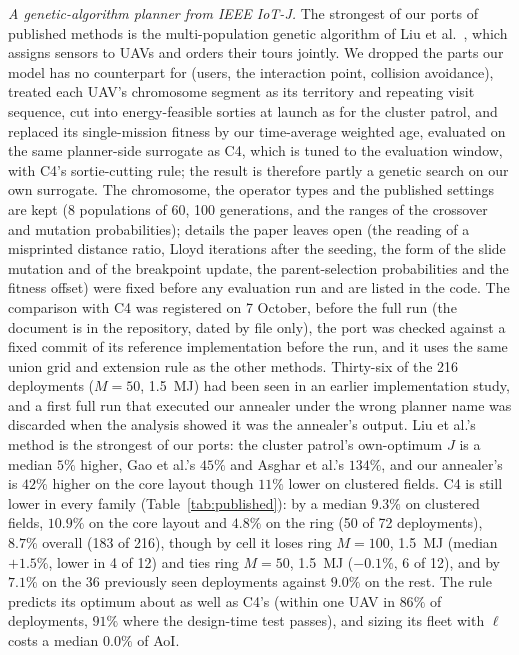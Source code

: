 \documentclass[journal,outdir=./]{IEEEtran}
\begin{document}
\textit{A genetic-algorithm planner from IEEE IoT-J.} The strongest of our ports of published methods is the multi-population genetic algorithm of Liu et al.\ \cite{liu2022aoi}, which assigns sensors to UAVs and orders their tours jointly. We dropped the parts our model has no counterpart for (users, the interaction point, collision avoidance), treated each UAV's chromosome segment as its territory and repeating visit sequence, cut into energy-feasible sorties at launch as for the cluster patrol, and replaced its single-mission fitness by our time-average weighted age, evaluated on the same planner-side surrogate as C4, which is tuned to the evaluation window, with C4's sortie-cutting rule; the result is therefore partly a genetic search on our own surrogate. The chromosome, the operator types and the published settings are kept (8 populations of 60, 100 generations, and the ranges of the crossover and mutation probabilities); details the paper leaves open (the reading of a misprinted distance ratio, Lloyd iterations after the seeding, the form of the slide mutation and of the breakpoint update, the parent-selection probabilities and the fitness offset) were fixed before any evaluation run and are listed in the code. The comparison with C4 was registered on 7 October, before the full run (the document is in the repository, dated by file only), the port was checked against a fixed commit of its reference implementation before the run, and it uses the same union grid and extension rule as the other methods. Thirty-six of the 216 deployments ($M=50$, 1.5~MJ) had been seen in an earlier implementation study, and a first full run that executed our annealer under the wrong planner name was discarded when the analysis showed it was the annealer's output. Liu et al.'s method is the strongest of our ports: the cluster patrol's own-optimum $J$ is a median $5\%$ higher, Gao et al.'s $45\%$ and Asghar et al.'s $134\%$, and our annealer's is $42\%$ higher on the core layout though $11\%$ lower on clustered fields. C4 is still lower in every family (Table~\ref{tab:published}): by a median $9.3\%$ on clustered fields, $10.9\%$ on the core layout and $4.8\%$ on the ring (50 of 72 deployments), $8.7\%$ overall (183 of 216), though by cell it loses ring $M=100$, 1.5~MJ (median $+1.5\%$, lower in 4 of 12) and ties ring $M=50$, 1.5~MJ ($-0.1\%$, 6 of 12), and by $7.1\%$ on the 36 previously seen deployments against $9.0\%$ on the rest. The rule predicts its optimum about as well as C4's (within one UAV in $86\%$ of deployments, $91\%$ where the design-time test passes), and sizing its fleet with $\ell$ costs a median $0.0\%$ of AoI.
\end{document}
